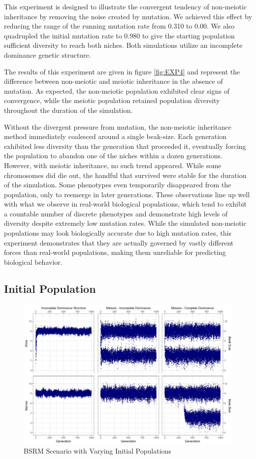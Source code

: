 \documentclass[conference]{IEEEtran}
\begin{document}
This experiment is designed to illustrate the convergent tendency of non-meiotic inheritance by removing the noise created by mutation. We achieved this effect by reducing the range of the running mutation rate from 0.310 to 0.00. We also quadrupled the initial mutation rate to 0.980 to give the starting population sufficient diversity to reach both niches. Both simulations utilize an incomplete dominance genetic structure. 

The results of this experiment are given in figure \ref{fig:EXP4} and represent the difference between non-meiotic and meiotic inheritance in the absence of mutation. As expected, the non-meiotic population exhibited clear signs of convergence, while the meiotic population retained population diversity throughout the duration of the simulation. 

Without the divergent pressure from mutation, the non-meiotic inheritance method immediately coalesced around a single beak-size. Each generation exhibited less diversity than the generation that proceeded it, eventually forcing the population to abandon one of the niches within a dozen generations. However, with meiotic inheritance, no such trend appeared. While some chromosomes did die out, the handful that survived were stable for the duration of the simulation. Some phenotypes even temporarily disappeared from the population, only to reemerge in later generations. These observations line up well with what we observe in real-world biological populations, which tend to exhibit a countable number of discrete phenotypes and demonstrate high levels of diversity despite extremely low mutation rates. While the simulated non-meiotic populations may look biologically accurate due to high mutation rates, this experiment demonstrates that they are actually governed by vastly different forces than real-world populations, making them unreliable for predicting biological behavior. 

\subsection{Initial Population}

\begin{figure}
    \centering
    \includegraphics[width=\linewidth]{Data/EXP5}
    \caption{BSRM Scenario with Varying Initial Populations}
    \label{fig:EXP5}
\end{figure}
\end{document}
